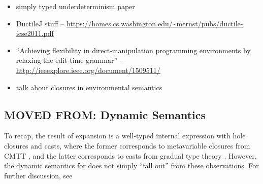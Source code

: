 \begin{itemize}
	\item simply typed underdeterminism paper
	\item DuctileJ stuff -- \url{https://homes.cs.washington.edu/~mernst/pubs/ductile-icse2011.pdf}
	\item ``Achieving flexibility in direct-manipulation programming environments by relaxing the edit-time grammar'' -- \url{http://ieeexplore.ieee.org/document/1509511/}
	\item talk about closures in environmental semantics
\end{itemize}



%
%
%
\subsection{MOVED FROM: Dynamic Semantics}

To recap, the result of expansion is a well-typed internal expression with hole closures and casts, 
where the former corresponds to metavariable closures from CMTT \cite{Nanevski2008}, 
and the latter corresponds to casts from gradual type theory \cite{Siek06a,DBLP:conf/snapl/SiekVCB15}. 
However, the dynamic semantics for \HazelnutLive does not simply ``fall out'' from these observations.
%
For further discussion, see 

